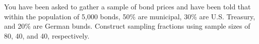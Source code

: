 \documentclass[11pt]{article}
\begin{document}
\begin{problem}{5}
You have been asked to gather a sample of bond prices and have been told that within the population of 5,000 bonds, 50\% are municipal, 30\% are U.S. Treasury, and 20\% are German bunds. Construct sampling fractions using sample sizes of 80, 40, and 40, respectively. 
\vfill
\vfill
\end{problem}
\showpoints
\thispagestyle{empty}
\end{document}
